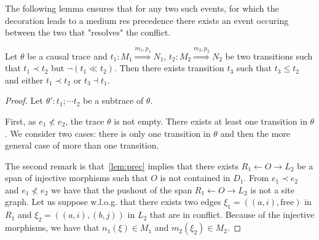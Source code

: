 The following lemma ensures that for any two such events, for which the decoration leads to a medium res precedence there exists an event occuring between the two that "resolves" the conflict.

\begin{lemma}
  Let $\theta$ be a causal trace and $t_1:M_1\overset{m_1,p_1}{\Rightarrow} N_1$, $t_2:M_2\overset{m_2,p_2}{\Rightarrow} N_2$ be two transitions such that $t_1\prec t_2$ but $\neg(t_1\ll t_2)$. Then there exists transition $t_3$ such that $t_3\leq t_2$ and either $t_1\prec t_2$ or $t_3\dashv t_1$.
\end{lemma}
\begin{proof}
  Let $\theta':t_1;\cdots t_2$ be a subtrace of $\theta$.

  First, as $e_1\not< e_2$, the trace $\theta$ is not empty. There exists at least one transition in $\theta$. We consider two cases: there is only one transition in $\theta$ and then the more general case of more than one transition.

  The second remark is that~\autoref{lem:prec} implies that there exists $R_1\leftarrow O\rightarrow L_2$ be a span of injective morphisms such that $O$ is not contained in $D_1$. From $e_1\prec e_2$ and $e_1\not< e_2$ we have that the pushout of the span $R_1\leftarrow O\rightarrow L_2$ is not a site graph. Let us suppose w.l.o.g. that there exists two edges $\xi_1=((a,i), \text{free})$ in $R_1$ and $\xi_2=((a,i),(b,j))$ in $L_2$ that are in conflict. Because of the injective morphisms, we have that $n_1(\xi) \in M_1$ and $m_2(\xi_2)\in M_2$.


\end{proof}
